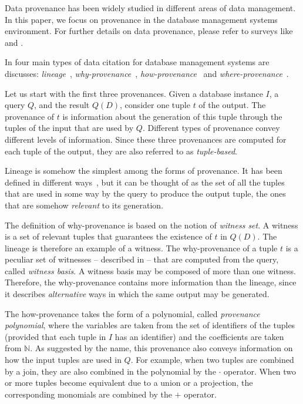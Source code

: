 Data provenance has been widely studied in different areas of data management. 
In this paper, we focus on provenance in the database management systems environment. For further details on data provenance, please refer to surveys like \citep{CheneyProvSurvey} and \citep{SimmhanPG05}.

In \citep{CheneyProvSurvey} four main types of data citation for database management systems are discusses: \emph{lineage}~\citep{lineageCui}, \emph{why-provenance}~\citep{WhyProvBuneman}, \emph{how-provenance}~\citep{howProvenanceGreen} and \emph{where-provenance}~\citep{WhyProvBuneman}.

Let us start with the first three provenances. Given a database instance $I$, a query $Q$, and the result $Q(D)$, consider one tuple $t$ of the output. 
The provenance of $t$ is information about the generation of this tuple through the tuples of the input that are used by $Q$. Different types of provenance convey different levels of information. Since these three provenances are computed for each tuple of the output, they are also referred to as \emph{tuple-based}.

Lineage is somehow the simplest among the forms of provenance. It has been defined in different ways~\citep{CheneyProvSurvey}, but it can be thought of as the set of all the tuples that are used in some way by the query to produce the output tuple, the ones that are somehow \emph{relevant} to its generation. 

The definition of why-provenance is based on the notion of \emph{witness set}. A witness is a set of relevant tuples that guarantees the existence of $t$ in $Q(D)$. The lineage is therefore an example of a witness. The why-provenance of a tuple $t$ is a peculiar set of witnesses  -- described in \citep{WhyProvBuneman} -- that are computed from the query, called \emph{witness basis}. 
A witness basis may be composed of more than one witness. 
Therefore, the why-provenance contains more information than the lineage, since it describes \emph{alternative} ways in which the same output may be generated. 

The how-provenance takes the form of a polynomial, called \emph{provenance polynomial}, where the variables are taken from the set of identifiers of the tuples (provided that each tuple in $I$ has an identifier) and the coefficients are taken from $\mathbb{N}$. 
As suggested by the name, this provenance also conveys information on how the input tuples are used in $Q$. For example, when two tuples are combined by a join, they are also combined in the polynomial by the $\cdot$ operator. When two or more tuples become equivalent due to a union or a projection, the corresponding monomials are combined by the $+$ operator.

